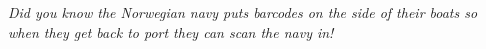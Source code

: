 















\clearpage
\thispagestyle{empty}
\hspace{0pt}
\vfill
\textit{Did you know the Norwegian navy puts barcodes on the side of their boats so when they get back to port they can scan the navy in!}
\vfill
\clearpage
